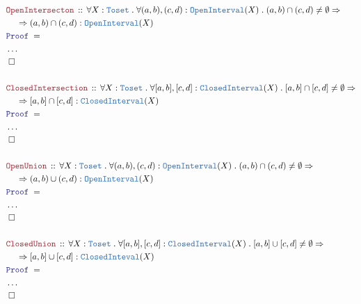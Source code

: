 \documentclass[12pt]{scrartcl}
\newcommand{\TYPE}[1]{\textcolor{NavyBlue}{\mathtt{#1}}}
\newcommand{\LOGIC}[1]{\textcolor{Blue}{\mathtt{#1}}}
\newcommand{\THM}[1]{\textcolor{Maroon}{\mathtt{#1}}}
\renewcommand{\.}{\; . \;}
\newcommand{\Theorem}[2]{& \THM{#1} \, :: \, #2 \\ & \Proof = \\ }
\newcommand{\NewLine}{\\ & \kern 1pc}
\newcommand{\Page}[1]{ \begin{align*} #1 \end{align*}   }
\newcommand{\NoProof}{ & \ldots \\ \EndProof}
\newcommand{\QED}{\; \square}
\newcommand{\EndProof}{& \QED \\}
\newcommand{\Proof}{\LOGIC{Proof} \; }
\begin{document}
\Page{
	\Theorem{OpenIntersecton}{ \forall X : \TYPE{Toset} \. \forall (a,b),(c,d) : \TYPE{OpenInterval}(X) \. 
		(a,b) \cap (c,d) \neq \emptyset \Rightarrow 
		\NewLine
		\Rightarrow (a,b) \cap (c,d)  : \TYPE{OpenInterval}(X)
	}
	\NoProof
	\\
	\Theorem{ClosedIntersection}{ \forall X : \TYPE{Toset} \. \forall [a,b],[c,d] : \TYPE{ClosedInterval}(X)
		\. [a,b] \cap [c,d] \neq \emptyset \Rightarrow 
		\NewLine
		\Rightarrow[a,b] \cap [c,d] : \TYPE{ClosedInterval}(X) }
	\NoProof
	\\
	\Theorem{OpenUnion}{\forall X : \TYPE{Toset} \. \forall (a,b), (c,d) : \TYPE{OpenInterval}(X)
		\. (a,b) \cap (c,d) \neq \emptyset \Rightarrow 
		\NewLine
		\Rightarrow (a,b) \cup (c,d) : \TYPE{OpenInterval}(X)}
	\NoProof
	\\
	\Theorem{ClosedUnion}{\forall X : \TYPE{Toset} \. \forall [a,b], [c,d] : \TYPE{ClosedInterval}(X)
		\. [a,b] \cup [c,d] \neq \emptyset \Rightarrow 
		\NewLine
		\Rightarrow [a,b] \cup [c,d] : \TYPE{ClosedInteval}(X)}
	\NoProof
	}
\newpage
\end{document}
